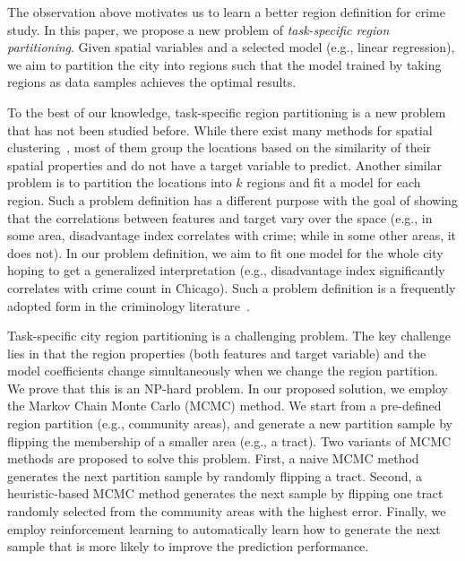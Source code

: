 The observation above motivates us to learn a better region definition for crime study. In this paper, we propose a new problem of \emph{task-specific region partitioning}. Given spatial variables and a selected model  (e.g., linear regression), we aim to partition the city into regions such that the model trained by taking regions as data samples achieves the optimal results.

To the best of our knowledge, task-specific region partitioning is a new problem that has not been studied before. While there exist many methods for spatial clustering~\cite{miller2009geographic}, most of them group the locations based on the similarity of their spatial properties and do not have a target variable to predict. Another similar problem is to partition the locations into $k$ regions and fit a model for each region. Such a problem definition has a different purpose with the goal of showing that the correlations between features and target vary over the space (e.g., in some area, disadvantage index  correlates with crime; while in some other areas, it does not). In our problem definition, we aim to fit one model for the whole city hoping to get a generalized interpretation (e.g., disadvantage index significantly correlates with crime count in Chicago). Such a problem definition is a frequently adopted form in the criminology literature~\cite{graif2014urban}.

Task-specific city region partitioning is a challenging problem. The key challenge lies in that the region properties (both features and target variable) and the model coefficients change simultaneously when we change the region partition. We prove that this is an NP-hard problem. In our proposed solution, we employ the Markov Chain Monte Carlo (MCMC) method. We start from a pre-defined region partition (e.g., community areas), and generate a new partition sample by flipping the membership of a smaller area (e.g., a tract). Two variants of MCMC methods are proposed to solve this problem. First, a naive MCMC method generates the next partition sample by randomly flipping a tract. Second, a heuristic-based MCMC method generates the next sample by flipping one tract randomly selected from the community areas with the highest error. Finally, we employ reinforcement learning to automatically learn how to generate the next sample that is more likely to improve the prediction performance.


